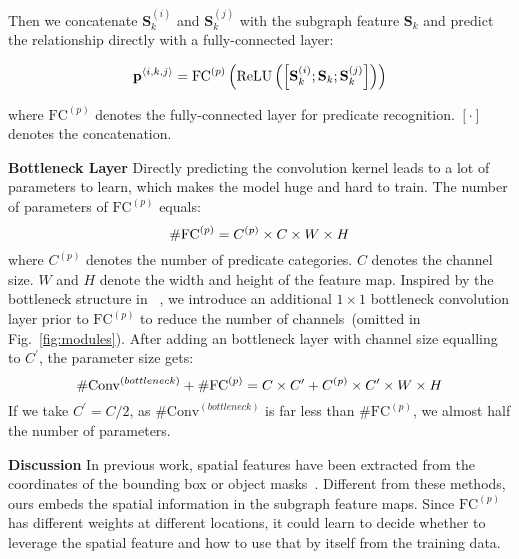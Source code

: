 \documentclass[runningheads]{llncs}
\begin{document}
Then we concatenate $\mathbf{S}^{(i)}_{k}$ and $\mathbf{S}^{(j)}_{k}$ with the subgraph feature $\mathbf{S}_{k}$ and predict the relationship directly with a fully-connected layer:

\begin{equation}\small
\mathbf{p}^{\langle i,k,j\rangle} = \mathrm{FC}^{(p)}\left(\mathrm{ReLU}\left(\left[\mathbf{S}^{(i)}_{k};\mathbf{S}_{k};\mathbf{S}^{(j)}_{k}\right]\right)\right)
\label{eq:predicate_fc}
\end{equation}

\noindent where $\mathrm{FC}^{(p)}$ denotes the fully-connected layer for predicate recognition. $\left[\cdot\right]$ denotes the concatenation. 

\noindent\textbf{Bottleneck Layer}
Directly predicting the convolution kernel leads to a lot of parameters to learn, which makes the model huge and hard to train. The number of parameters of $\mathrm{FC}^{(p)}$ equals:
\begin{equation}\small
\#\mathrm{FC}^{(p)} = C^{(p)} \times C \times W\times H
\label{eq:para_size}
\end{equation}
\noindent where $C^{(p)}$ denotes the number of predicate categories. $C$ denotes the channel size. $W$ and $H$ denote the width and height of the feature map. 
Inspired by the bottleneck structure in ~\cite{resnet}, we introduce an additional $1\times1$ bottleneck convolution layer prior to $\mathrm{FC}^{(p)}$ to reduce the number of channels~(omitted in Fig.~\ref{fig:modules}).
After adding an bottleneck layer with channel size equalling to $C^\prime$, the parameter size gets:
\begin{equation}\small
\#\mathrm{Conv}^{(bottleneck)} + \#\mathrm{FC}^{(p)}  = C\times C^\prime + C^{(p)} \times C^\prime \times W\times H
\label{eq:para_size_bottleneck}
\end{equation}
If we take $C^\prime=C/2$, as $\#\mathrm{Conv}^{(bottleneck)}$ is far less than $\#\mathrm{FC}^{(p)}$, we almost half the number of parameters. 

\noindent\textbf{Discussion}
In previous work, spatial features have been extracted from the coordinates of the bounding box or object masks~\cite{dai2017detecting,liao2017natural,yu2017visual}. Different from these methods, ours embeds the spatial information in the subgraph feature maps. Since $\mathrm{FC}^{(p)}$ has different weights at different locations, it could learn to decide whether to leverage the spatial feature and how to use that by itself from the training data. 
\end{document}
